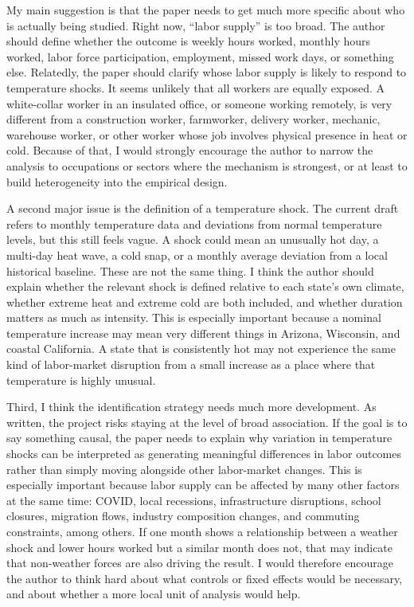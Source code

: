 \documentclass[12pt]{article}
\begin{document}
My main suggestion is that the paper needs to get much more specific about who is actually being studied. Right now, ``labor supply'' is too broad. The author should define whether the outcome is weekly hours worked, monthly hours worked, labor force participation, employment, missed work days, or something else. Relatedly, the paper should clarify whose labor supply is likely to respond to temperature shocks. It seems unlikely that all workers are equally exposed. A white-collar worker in an insulated office, or someone working remotely, is very different from a construction worker, farmworker, delivery worker, mechanic, warehouse worker, or other worker whose job involves physical presence in heat or cold. Because of that, I would strongly encourage the author to narrow the analysis to occupations or sectors where the mechanism is strongest, or at least to build heterogeneity into the empirical design.

A second major issue is the definition of a temperature shock. The current draft refers to monthly temperature data and deviations from normal temperature levels, but this still feels vague. A shock could mean an unusually hot day, a multi-day heat wave, a cold snap, or a monthly average deviation from a local historical baseline. These are not the same thing. I think the author should explain whether the relevant shock is defined relative to each state’s own climate, whether extreme heat and extreme cold are both included, and whether duration matters as much as intensity. This is especially important because a nominal temperature increase may mean very different things in Arizona, Wisconsin, and coastal California. A state that is consistently hot may not experience the same kind of labor-market disruption from a small increase as a place where that temperature is highly unusual.

Third, I think the identification strategy needs much more development. As written, the project risks staying at the level of broad association. If the goal is to say something causal, the paper needs to explain why variation in temperature shocks can be interpreted as generating meaningful differences in labor outcomes rather than simply moving alongside other labor-market changes. This is especially important because labor supply can be affected by many other factors at the same time: COVID, local recessions, infrastructure disruptions, school closures, migration flows, industry composition changes, and commuting constraints, among others. If one month shows a relationship between a weather shock and lower hours worked but a similar month does not, that may indicate that non-weather forces are also driving the result. I would therefore encourage the author to think hard about what controls or fixed effects would be necessary, and about whether a more local unit of analysis would help.
\end{document}
